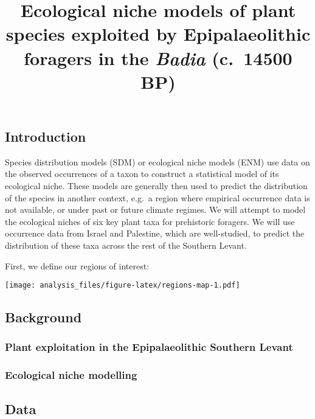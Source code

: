 \documentclass[]{article}
\title{Ecological niche models of plant species exploited by Epipalaeolithic
foragers in the \emph{Badia} (c.~14500 BP)}
\author{}
\date{}
\begin{document}
\maketitle

\hypertarget{introduction}{%
\subsection{Introduction}\label{introduction}}

Species distribution models (SDM) or ecological niche models (ENM) use
data on the observed occurrences of a taxon to construct a statistical
model of its ecological niche. These models are generally then used to
predict the distribution of the species in another context, e.g.~a
region where empirical occurrence data is not available, or under past
or future climate regimes. We will attempt to model the ecological
niches of six key plant taxa for prehistoric foragers. We will use
occurrence data from Israel and Palestine, which are well-studied, to
predict the distribution of these taxa across the rest of the Southern
Levant.

First, we define our regions of interest:

\texttt{[image: analysis\_files/figure-latex/regions-map-1.pdf]}

\hypertarget{background}{%
\subsection{Background}\label{background}}

\hypertarget{plant-exploitation-in-the-epipalaeolithic-southern-levant}{%
\subsubsection{Plant exploitation in the Epipalaeolithic Southern
Levant}\label{plant-exploitation-in-the-epipalaeolithic-southern-levant}}

\hypertarget{ecological-niche-modelling}{%
\subsubsection{Ecological niche
modelling}\label{ecological-niche-modelling}}

\hypertarget{data}{%
\subsection{Data}\label{data}}
\end{document}
